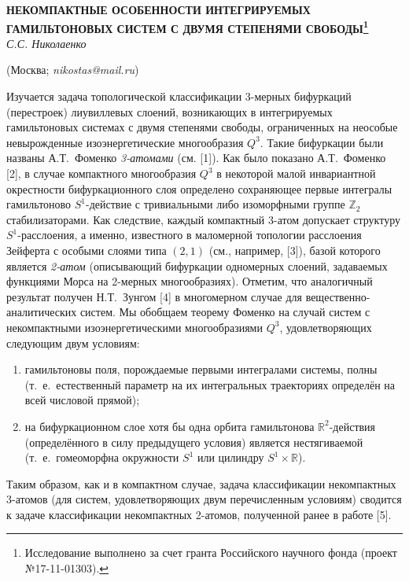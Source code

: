 
\begin{center}
    {\bf НЕКОМПАКТНЫЕ ОСОБЕННОСТИ ИНТЕГРИРУЕМЫХ ГАМИЛЬТОНОВЫХ СИСТЕМ С ДВУМЯ СТЕПЕНЯМИ СВОБОДЫ\footnote{Исследование выполнено за счет гранта Российского научного фонда (проект №17-11-01303).}}\\

    {\it С.С. Николаенко}

    (Москва; {\it nikostas@mail.ru})
\end{center}


Изучается задача топологической классификации 3-мер\-ных бифуркаций (перестроек) лиувиллевых слоений, возникающих в интегрируемых гамильтоновых системах с двумя степенями свободы, ограниченных на неособые невырожденные изоэнергетические многообразия $Q^3$. Такие бифуркации были названы А.Т.~Фоменко {\it 3-атомами} (см. [1]). Как было показано А.Т.~Фоменко [2], в случае компактного многообразия $Q^3$ в некоторой малой инвариантной окрестности бифуркационного слоя определено сохраняющее первые интегралы гамильтоново $S^1$-действие с тривиальными либо изоморфными группе $\mathbb Z_2$ стабилизаторами. Как следствие, каждый компактный 3-атом допускает структуру $S^1$-расслоения, а именно, известного в маломерной топологии расслоения Зейферта с особыми слоями типа $(2,1)$ (см., например, [3]), базой которого является {\it 2-атом} (описывающий бифуркации одномерных слоений, задаваемых функциями Морса на 2-мерных многообразиях). Отметим, что аналогичный результат получен Н.Т.~Зунгом [4] в многомерном случае для вещественно-аналитических систем. Мы обобщаем теорему Фоменко на случай систем с некомпактными изоэнергетическими многообразиями $Q^3$, удовлетворяющих следующим двум условиям:
\begin{enumerate}
	\item гамильтоновы поля, порождаемые первыми интегралами системы, полны (т.~е.~естественный параметр на их интегральных траекториях определён на всей числовой прямой);
	\item на бифуркационном слое хотя бы одна орбита гамильтонова $\mathbb R^2$-действия (определённого в силу предыдущего условия) является нестягиваемой (т.~е.~гомеоморфна окружности $S^1$ или цилиндру $S^1\times\mathbb R$).
\end{enumerate}
Таким образом, как и в компактном случае, задача классификации некомпактных 3-атомов (для систем, удовлетворяющих двум перечисленным условиям) сводится к задаче классификации некомпактных 2-атомов, полученной ранее в работе [5].



